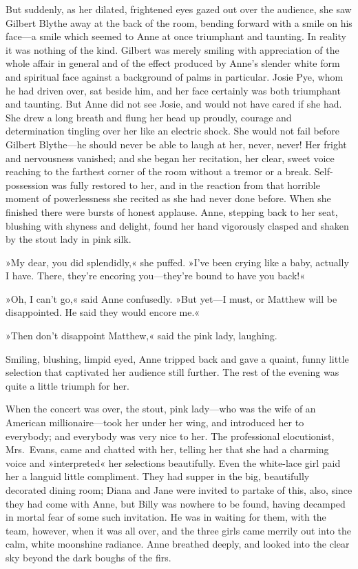 But suddenly, as her dilated, frightened eyes gazed out over the audience, she saw Gilbert Blythe away at the back of the room, bending forward with a smile on his face—a smile which seemed to Anne at once triumphant and taunting. In reality it was nothing of the kind. Gilbert was merely smiling with appreciation of the whole affair in general and of the effect produced by Anne's slender white form and spiritual face against a background of palms in particular. Josie Pye, whom he had driven over, sat beside him, and her face certainly was both triumphant and taunting. But Anne did not see Josie, and would not have cared if she had. She drew a long breath and flung her head up proudly, courage and determination tingling over her like an electric shock. She would not fail before Gilbert Blythe—he should never be able to laugh at her, never, never! Her fright and nervousness vanished; and she began her recitation, her clear, sweet voice reaching to the farthest corner of the room without a tremor or a break. Self-possession was fully restored to her, and in the reaction from that horrible moment of powerlessness she recited as she had never done before. When she finished there were bursts of honest applause. Anne, stepping back to her seat, blushing with shyness and delight, found her hand vigorously clasped and shaken by the stout lady in pink silk.

»My dear, you did splendidly,« she puffed. »I've been crying like a baby, actually I have. There, they're encoring you—they're bound to have you back!«

»Oh, I can't go,« said Anne confusedly. »But yet—I must, or Matthew will be disappointed. He said they would encore me.«

»Then don't disappoint Matthew,« said the pink lady, laughing.

Smiling, blushing, limpid eyed, Anne tripped back and gave a quaint, funny little selection that captivated her audience still further. The rest of the evening was quite a little triumph for her.

When the concert was over, the stout, pink lady—who was the wife of an American millionaire—took her under her wing, and introduced her to everybody; and everybody was very nice to her. The professional elocutionist, Mrs.~Evans, came and chatted with her, telling her that she had a charming voice and »interpreted« her selections beautifully. Even the white-lace girl paid her a languid little compliment. They had supper in the big, beautifully decorated dining room; Diana and Jane were invited to partake of this, also, since they had come with Anne, but Billy was nowhere to be found, having decamped in mortal fear of some such invitation. He was in waiting for them, with the team, however, when it was all over, and the three girls came merrily out into the calm, white moonshine radiance. Anne breathed deeply, and looked into the clear sky beyond the dark boughs of the firs.

